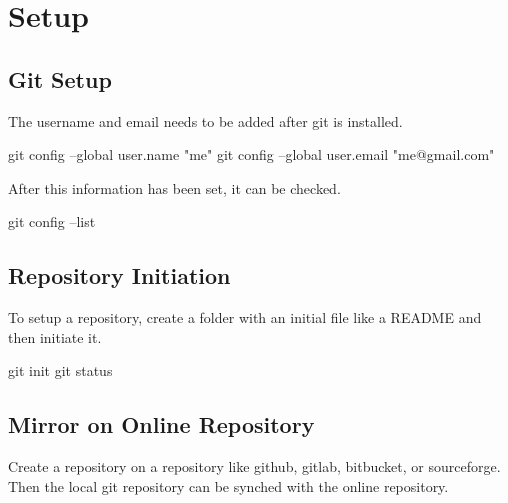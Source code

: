 \documentclass[]{book}
\newenvironment{Shaded}{\begin{snugshade}}{\end{snugshade}}
\newcommand{\FunctionTok}[1]{\textcolor[rgb]{0.00,0.00,0.00}{#1}}
\newcommand{\NormalTok}[1]{#1}
\newcommand{\StringTok}[1]{\textcolor[rgb]{0.31,0.60,0.02}{#1}}
\begin{document}
\hypertarget{setup}{%
\section{Setup}\label{setup}}

\hypertarget{git-setup}{%
\subsection{Git Setup}\label{git-setup}}

The username and email needs to be added after git is installed.

\begin{Shaded}
\begin{Highlighting}[]
\FunctionTok{git}\NormalTok{ config --global user.name }\StringTok{"me"}
\FunctionTok{git}\NormalTok{ config --global user.email }\StringTok{"me@gmail.com"}
\end{Highlighting}
\end{Shaded}

After this information has been set, it can be checked.

\begin{Shaded}
\begin{Highlighting}[]
\FunctionTok{git}\NormalTok{ config --list}
\end{Highlighting}
\end{Shaded}

\hypertarget{repository-initiation}{%
\subsection{Repository Initiation}\label{repository-initiation}}

To setup a repository, create a folder with an initial file like a README and then initiate it.

\begin{Shaded}
\begin{Highlighting}[]
\FunctionTok{git}\NormalTok{ init}
\FunctionTok{git}\NormalTok{ status}
\end{Highlighting}
\end{Shaded}

\hypertarget{mirror-on-online-repository}{%
\subsection{Mirror on Online Repository}\label{mirror-on-online-repository}}

Create a repository on a repository like github, gitlab, bitbucket, or sourceforge. Then the local git repository can be synched with the online repository.
\end{document}
